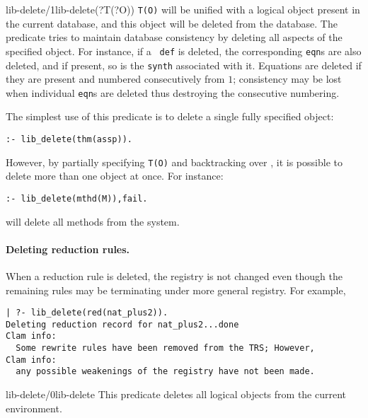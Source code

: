 \begin{predicate}{lib-delete/1}{lib-delete(?T(?O))}%
{\tt T(O)} will be unified with a logical object present in the
current database, and this object will be deleted from the
database. The predicate tries to maintain database consistency by
deleting all aspects of the specified object.  For instance, if a {\tt
def} is deleted, the corresponding {\tt eqn}s are also deleted, and if
present, so is the {\tt synth} associated with it.  Equations are
deleted if they are present and numbered consecutively from $1$;
consistency may be lost when individual {\tt eqn}s are deleted thus
destroying the consecutive numbering.

The simplest use of this predicate is to delete a
single fully specified object:
\begin{verbatim}
:- lib_delete(thm(assp)).
\end{verbatim}
However, by partially specifying {\tt T(O)} and backtracking over
, it is possible to delete more than one object at
once. For instance:
\begin{verbatim}
:- lib_delete(mthd(M)),fail.
\end{verbatim}
will delete all methods from the system.

\paragraph {Deleting reduction rules.}
When a reduction rule is deleted, the registry is not
changed even though the remaining rules may be terminating under more
general registry.  For example,
\begin{verbatim}
| ?- lib_delete(red(nat_plus2)).
Deleting reduction record for nat_plus2...done
Clam info:
  Some rewrite rules have been removed from the TRS; However,
Clam info:
  any possible weakenings of the registry have not been made.
\end{verbatim}
\end{predicate}

\begin{predicate}{lib-delete/0}{lib-delete}%
This predicate deletes all logical objects from the current
environment.
\end{predicate}

